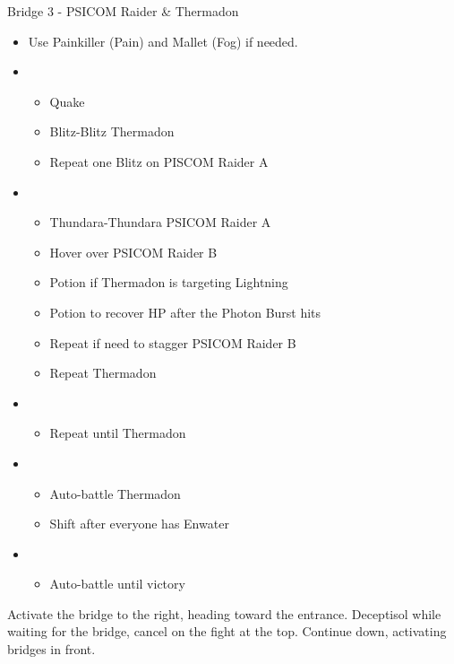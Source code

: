 \documentclass{report}
\begin{document}
\begin{battle}{Bridge 3 - PSICOM Raider \& Thermadon}
\begin{itemize}
    \item Use Painkiller (Pain) and Mallet (Fog) if needed.
    \item \first
    \begin{itemize}
        \item Quake
        \item Blitz-Blitz Thermadon
        \item Repeat one Blitz on PISCOM Raider A
    \end{itemize}
    \item \second
    \begin{itemize}
        \item Thundara-Thundara PSICOM Raider A
        \item Hover over PSICOM Raider B
        \item Potion if Thermadon is targeting Lightning
        \item Potion to recover HP after the Photon Burst hits
        \item Repeat if need to stagger PSICOM Raider B
        \item Repeat Thermadon
    \end{itemize}
    \item \fourth
    \begin{itemize}
        \item Repeat until Thermadon \stagger
    \end{itemize}
    \item \first
    \begin{itemize}
        \item Auto-battle Thermadon
        \item Shift after everyone has Enwater
    \end{itemize}
    \item \fifth
    \begin{itemize}
        \item Auto-battle until victory
    \end{itemize}
\end{itemize}
  
\end{battle}

Activate the bridge to the right, heading toward the entrance. Deceptisol while waiting for the bridge, cancel on the fight at the top. Continue down, activating bridges in front.
\end{document}
